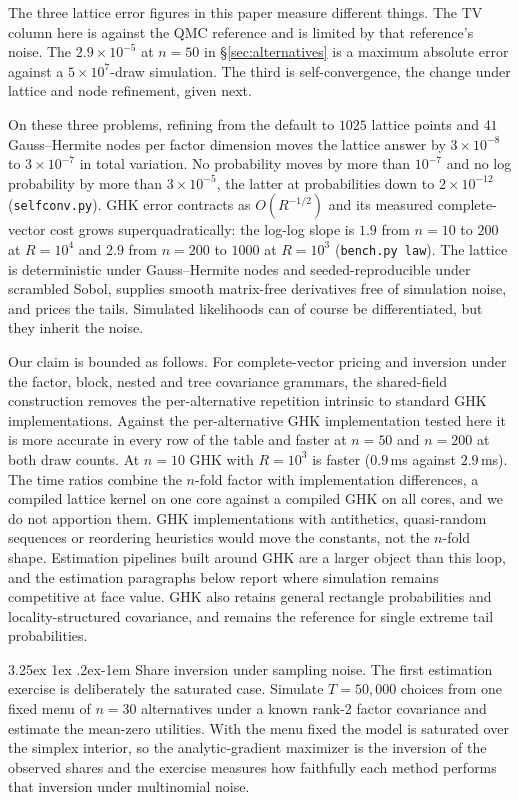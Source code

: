 \documentclass[11pt]{article}
\makeatletter
\renewcommand\paragraph{\@startsection{paragraph}{4}{\z@}%
  {3.25ex \@plus1ex \@minus.2ex}{-1em}%
  {\normalfont\normalsize\itshape}}
\makeatother
\begin{document}
The three lattice error figures in this paper measure different things.
The TV column here is against the QMC reference and is limited by that
reference's noise. The $2.9\times10^{-5}$ at $n=50$ in
\S\ref{sec:alternatives} is a maximum absolute error against a
$5\times10^{7}$-draw simulation. The third is self-convergence, the
change under lattice and node refinement, given next.

On these three problems, refining from the default to $1025$ lattice
points and $41$ Gauss--Hermite nodes per factor dimension moves the
lattice answer by $3\times10^{-8}$ to $3\times10^{-7}$ in total
variation. No probability moves by more than $10^{-7}$ and no log
probability by more than $3\times10^{-5}$, the latter at probabilities
down to $2\times10^{-12}$ (\texttt{selfconv.py}). GHK error
contracts as $O(R^{-1/2})$ and its measured complete-vector cost grows
superquadratically: the log-log slope is $1.9$ from $n=10$ to $200$ at
$R=10^4$ and $2.9$ from $n=200$ to $1000$ at $R=10^3$ (\texttt{bench.py
law}). The lattice is deterministic under Gauss--Hermite nodes and
seeded-reproducible under scrambled Sobol, supplies smooth matrix-free
derivatives free of simulation noise, and prices the tails. Simulated
likelihoods can of course be differentiated, but they inherit the noise.

Our claim is bounded as follows. For complete-vector pricing and
inversion under the factor, block, nested and tree covariance grammars,
the shared-field construction removes the per-alternative repetition
intrinsic to standard GHK implementations. Against the
per-alternative GHK implementation tested here it is more accurate in
every row of the table and faster at $n=50$ and $n=200$ at both draw
counts. At $n=10$ GHK with $R=10^3$ is faster ($0.9$\,ms against
$2.9$\,ms). The time ratios combine the $n$-fold factor with
implementation differences, a compiled lattice kernel on one core
against a compiled GHK on all cores, and we do not apportion them.
GHK implementations with antithetics, quasi-random sequences or
reordering heuristics would move the constants, not the $n$-fold shape.
Estimation pipelines built around GHK are a larger object than this loop,
and the estimation paragraphs below report where simulation remains
competitive at face value. GHK also retains general rectangle
probabilities and locality-structured covariance, and \citet{botev2017}
remains the reference for single extreme tail probabilities.

\paragraph{Share inversion under sampling noise.} The first estimation
exercise is deliberately the saturated case. Simulate $T=50{,}000$ choices
from one fixed menu of $n=30$ alternatives under a known rank-2 factor
covariance and estimate the mean-zero utilities. With
the menu fixed the model is saturated over the simplex interior, so the
analytic-gradient maximizer is the inversion of the observed shares and the
exercise measures how faithfully each method performs that inversion
under multinomial noise.
\end{document}
